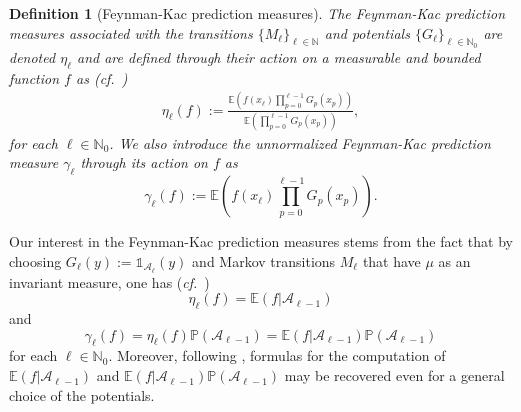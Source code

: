 \documentclass{article}
\newtheorem{definition}[theorem]{Definition}
\newcommand{\cA}{\mathcal{A}}
\newcommand{\IE}{\mathbb{E}}
\newcommand{\IN}{\mathbb{N}}
\newcommand{\IP}{\mathbb{P}}
\newcommand{\bOne}{\mathds{1}}
\theoremstyle{definition}
\begin{document}
\begin{definition}[Feynman-Kac prediction measures]
  \label{defi:FKP}
  The \emph{Feynman-Kac} prediction
  measures associated with the tran\-si\-tions $\{{M}_{\ell}\}_{\ell\in\IN}$ and potentials
  $\{{G}_{\ell}\}_{\ell\in\IN_0}$ are denoted $\eta_\ell$ and are defined through their action on a measurable
  and bounded function $f$ as (\emph{cf.}~\cite[Def.~2.3.2]{DelMoralFeynmanKac2004})
  \begin{align*}
    \eta_\ell(f):=\frac{\IE\left(f(x_\ell)\prod\limits_{p=0}^{\ell-1}G_p(x_p)\right)}{\IE\left(\prod\limits_{p=0}^{\ell-1}G_p(x_p)\right)},
  \end{align*}
  for each $\ell\in\IN_0$. We also introduce the unnormalized Feynman-Kac prediction measure $\gamma_\ell$ through its action on $f$ as
  $$
  \gamma_\ell(f):=\IE\left(f(x_\ell)\prod\limits_{p=0}^{\ell-1}G_p(x_p)\right).
  $$
\end{definition}
Our interest in the Feynman-Kac prediction measures stems from the fact that by choosing $G_\ell(y):=\bOne_{\cA_{\ell}}(y)$ and Markov transitions $M_\ell$ that have $\mu$ as an invariant measure, one has
(\emph{cf.}~\cite[Prop.~2]{cerouSequentialMonteCarlo2012})
$$\eta_{\ell}(f)=\IE(f\vert\cA_{\ell-1})$$ 
and
$$\gamma_\ell(f)=\eta_{\ell}(f)\IP(\cA_{\ell-1})=\IE(f\vert\cA_{\ell-1})\IP(\cA_{\ell-1})$$
for each $\ell\in\IN_0$. Moreover, following \cite{delmoralGenealogicalParticleAnalysis2005},
formulas for the computation of $\IE(f\vert\cA_{\ell-1})$ and $\IE(f\vert\cA_{\ell-1})\IP(\cA_{\ell-1})$ may be recovered even for a general choice of the potentials.
\end{document}
